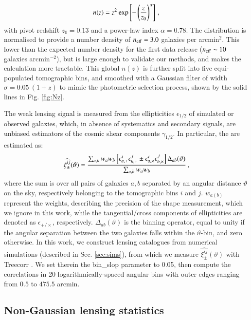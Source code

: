 \begin{eqnarray}
n (z) =  z^2 \: {\rm exp} \left[-\left(\frac{z}{z_0}\right)^\alpha \right]\, ,
\label{eq:nz}
\end{eqnarray}
with pivot redshift $z_0=0.13$ and a power-law index $\alpha = 0.78$.
The distribution is normalised to provide a number density of $n_{\rm eff} = 3.0 $  galaxies per arcmin$^{2}$.
This lower than the expected number density for the first data release ($n_{\rm eff}\sim10$ galaxies arcmin$^{-2}$), but is large enough to validate our methods, and makes the calculation more tractable.
This global $n(z)$ is further split into five equi-populated tomographic bins, and smoothed with a Gaussian filter of width $\sigma = 0.05 \: (1 + z)$ to mimic the photometric selection process, shown by the solid lines in Fig. \ref{fig:Nz}. 

The weak lensing signal is measured from the ellipticities $\epsilon_{1/2}$ of simulated or observed galaxies, which, in absence of systematics and secondary signals, are unbiased estimators  of the cosmic shear components $\gamma_{1/2}$.
In particular, the \gtwopcf are estimated as:
\begin{eqnarray}
\widehat{\xi_{\pm}^{ij}}(\vartheta) = \frac{\sum_{a,b} w_a w_b \left[\epsilon_{a, \rm +}^i\epsilon_{b, \rm +}^j     \pm \epsilon_{a, \times}^i\epsilon_{b, \times}^j    \right]\Delta_{ab}(\vartheta)}{\sum_{a,b} w_a w_b} \, ,
\label{eq:2PCF_estimator}
\end{eqnarray}
where the sum is over all pairs of galaxies $a, b$ separated by an angular distance $\vartheta$ on the sky, respectively belonging to the tomographic bins $i$ and $j$.
$w_{a (b)}$ represent the weights, describing the precision of the shape measurement, which we ignore in this work, while the tangential/cross components of ellipticities are denoted as $\epsilon_{+/\times}$, respectively. 
$\Delta_{ab}(\vartheta)$ is the binning operator, equal to unity if the angular separation between the two galaxies falls within the $\vartheta$-bin, and zero otherwise.
In this work, we construct lensing catalogues from numerical simulations (described in Sec. \ref{sec:sims}), from which we measure $ \widehat{\xi_{\pm}^{ij}}(\vartheta)$ with {\sc Treecorr} \citep{TreeCorr}.
We set therein the {\sc bin\_slop} parameter to 0.05, then compute the correlations in 20 logarithmically-spaced angular bins with outer edges ranging from $0.5$ to $475.5$ arcmin. 
 
 
\subsection{Non-Gaussian lensing statistics}
\label{subsec:beyond-2pt}

